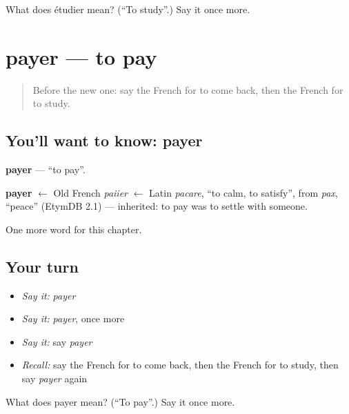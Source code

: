 \begin{tcolorbox}[breakable,colback=teal!4,colframe=teal!35!black,title={Before you move on}]
What does étudier mean? (\textquotedblleft{}To study\textquotedblright{}.) Say it once more.
\end{tcolorbox}
\section[payer]{payer — to pay}

\label{lesson:FR-C62-payer}



\begin{quote}
Before the new one: say the French for to come back, then the French for to study.
\end{quote}

\subsection*{You'll want to know: payer}
\textbf{payer} — \textquotedblleft{}to pay\textquotedblright{}.

\begin{cousinweb}
\textbf{payer} $\leftarrow$ Old French \emph{paiier} $\leftarrow$ Latin \emph{pacare}, \textquotedblleft{}to calm, to satisfy\textquotedblright{}, from \emph{pax}, \textquotedblleft{}peace\textquotedblright{} (EtymDB 2.1) — inherited: to pay was to settle with someone.
\end{cousinweb}

\begin{grammarlens}[title={What you've built}]
One more word for this chapter.
\end{grammarlens}

\subsection*{Your turn}
\begin{itemize}
\raggedright
  \item \emph{Say it:} \emph{payer}
  \item \emph{Say it:} \emph{payer}, once more
  \item \emph{Say it:} say \emph{payer}
  \item \emph{Recall:} say the French for to come back, then the French for to study, then say \emph{payer} again
\end{itemize}

\begin{tcolorbox}[breakable,colback=teal!4,colframe=teal!35!black,title={Before you move on}]
What does payer mean? (\textquotedblleft{}To pay\textquotedblright{}.) Say it once more.
\end{tcolorbox}
